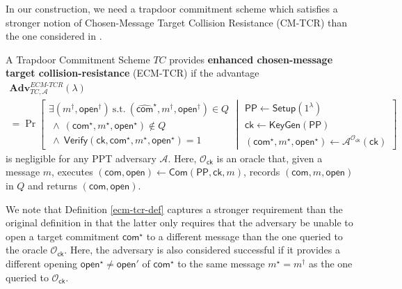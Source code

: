 \documentclass[10pt]{llncs}
\newcommand{\Adv}{\mathbf{Adv}}
\newcommand{\A}{\mathcal{A}}
\newcommand{\ck}{\mathsf{ck}}
\newcommand{\com}{\hat{\mathsf{com}}}
\newcommand{\open}{\mathsf{open}}
\newcommand{\Setup}{{\mathsf{Setup}}}
\newcommand{\KeyGen}{{\mathsf{KeyGen}}}
\newcommand{\PPP}{\mathsf{PP}}
\begin{document}
In our construction, we need a trapdoor commitment scheme which satisfies a stronger notion of  Chosen-Message Target Collision Resistance (CM-TCR) than the one considered in \cite[Definition 10]{DBLP:conf/eurocrypt/AbeKOT15}.
%
\begin{definition} \label{ecm-tcr-def}
  A Trapdoor Commitment Scheme $TC$ provides {\bf enhanced chosen-message 
  target collision-resistance} (ECM-TCR) if the advantage
  \begin{multline*}
    \Adv_{TC,\A}^{ECM \textrm{-}TCR}(\lambda) \\ = \Pr \left[                                  
    \begin{array}{l}
      \exists (m^\dagger,\open^\dagger) ~\mathrm{ s.t. }~ (\com^\star, m^\dagger, \open^\dagger) \in Q  \\
    ~ \wedge~ (\mathsf{com}^\star, m^\star, \open^\star) \not \in Q   \\
     ~ \wedge~ \mathsf{Verify}(\ck, \mathsf{com}^\star, m^\star, \open^\star) = 1
    \end{array}
		 \middle|
		  \begin{array}{l}
                                        \PPP \gets \Setup(1^\lambda)\\
                                        \ck \gets \KeyGen(\PPP)\\
                                        (\mathsf{com}^\star, m^\star, \open^\star) \gets \A^{\mathcal{O}_{\ck}  } (\ck) 
                                      \end{array}   
    \right]
  \end{multline*}
  is negligible for any PPT adversary $\A$. 
  Here, $\mathcal{O}_{\ck}$ is an oracle that, 
  given a message $m$,  executes $(\mathsf{com}, \open) \gets \mathsf{Com}(\PPP,\ck, m)$, 
  records $(\mathsf{com}, m, \open)$ in $Q$ and returns $(\mathsf{com}, \open)$.
\end{definition}
We note that Definition \ref{ecm-tcr-def} captures a stronger requirement than the original definition 
\cite[Definition 10]{DBLP:conf/eurocrypt/AbeKOT15} in that the latter only requires that the adversary be unable to open a target 
commitment $\mathsf{com}^\star$ to a different message than the one queried to the oracle $\mathcal{O}_{\ck}$. Here, the adversary is 
also considered successful if it provides a different opening  $\open^\star \neq \open'$ of $\mathsf{com}^\star$ to the same message $m^\star=m^\dagger$ 
as the one queried to $\mathcal{O}_{\ck}$. 
 
\end{document}
